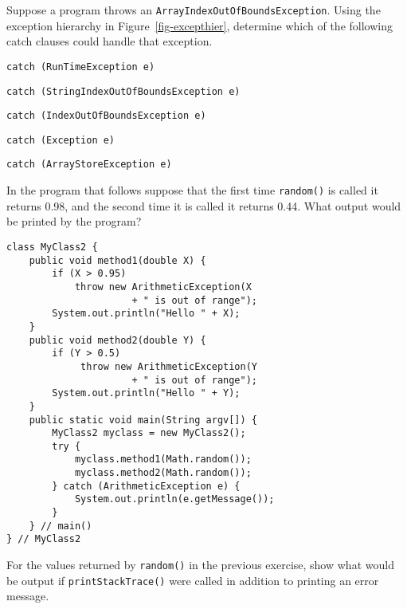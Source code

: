 \label{self-study-exercises}
\begin{SSTUDY}

\item  Suppose a program throws an {\tt ArrayIndexOutOf\-Bounds\-Exception}.
Using the exception hierarchy in Figure~\ref{fig-excepthier},
determine which of the following catch clauses could handle
that exception.

\begin{EXRLL}
\item  {\tt catch (RunTimeException e) {}}                 
\item  {\tt catch (StringIndexOutOfBoundsException e) {}}  
\item  {\tt catch (IndexOutOfBoundsException e) {}}        
\item  {\tt catch (Exception e) {}}                        
\item  {\tt catch (ArrayStoreException e) {}}              
\end{EXRLL}


\item  In the  program that follows suppose that the first time {\tt random()}
is called it returns 0.98, and the second time it is called it returns
0.44.  What output would be printed by the program?

\begin{jjjlisting}
\begin{lstlisting}
class MyClass2 {
    public void method1(double X) {
        if (X > 0.95)
            throw new ArithmeticException(X 
                      + " is out of range");
        System.out.println("Hello " + X);
    }
    public void method2(double Y) {
        if (Y > 0.5)
             throw new ArithmeticException(Y 
                      + " is out of range");
        System.out.println("Hello " + Y);
    }
    public static void main(String argv[]) {
        MyClass2 myclass = new MyClass2();
        try {
            myclass.method1(Math.random());
            myclass.method2(Math.random());
        } catch (ArithmeticException e) {
            System.out.println(e.getMessage());
        }
    } // main()
} // MyClass2
\end{lstlisting}
\end{jjjlisting}

\item  For the values returned by {\tt random()} in the previous exercise,
show what would be output if {\tt printStackTrace()} were called
in addition to printing an error message.



\end{SSTUDY}
